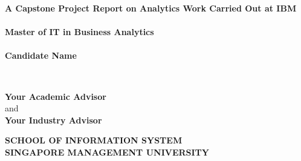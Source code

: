 \documentclass[titlepage,a4paper,12pt,thmsb]{report}
\begin{document}
\begin{titlepage}
\thispagestyle{empty}
\begin{center}
{\LARGE \bf{ A Capstone Project Report on Analytics Work Carried Out at IBM}} \\
\vspace{2.0cm}
 \\
\vskip 0.5cm
\bf{Master of IT in Business Analytics} \\
\vspace{0.5cm}
{} \\
\vspace{0.5cm}
\rm
{\large \bf {Candidate Name}}\\

\vspace{1cm}

{} \\
\vspace{.5cm}

\hspace{.05cm} {\bf {Your Academic Advisor}}\\
\hspace{.05cm} {\sc and}\\
\hspace{.05cm} {\bf {Your Industry Advisor}}\\
\vspace{0.5cm}
\vspace{0.5cm}

\begin{figure}[h]
{\par}
\end{figure}

\vskip 0.5cm

\large{\bf SCHOOL OF INFORMATION SYSTEM} \\
\vskip 0.5cm
\Large{\bf SINGAPORE MANAGEMENT UNIVERSITY}\\
\vskip 0.5cm
{\centering {}}
\end{center}
\pagebreak
\end{titlepage}
\end{document}
